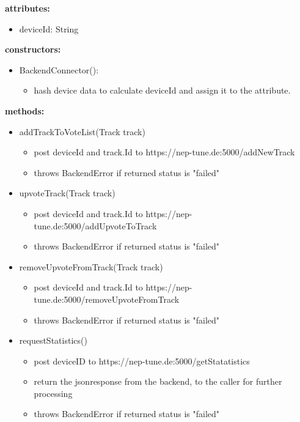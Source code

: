 \documentclass[oneside, nenglish]{sdqtechreport}
\begin{document}
 \textbf{attributes:}
 \begin{itemize}
     \item deviceId: String
 \end{itemize}
 \textbf{constructors:}
 \begin{itemize}
     \item BackendConnector():
     \begin{itemize}
         \item hash device data to calculate deviceId and assign it to the attribute.
     \end{itemize}
 \end{itemize}
 \textbf{methods:}
 \begin{itemize}
     \item addTrackToVoteList(Track track) 
     \begin{itemize}
         \item post deviceId and track.Id to https://nep-tune.de:5000/addNewTrack
         \item throws BackendError if returned status is "failed"
     \end{itemize}
     \item upvoteTrack(Track track)
     \begin{itemize}
         \item post deviceId and track.Id to https://nep-tune.de:5000/addUpvoteToTrack
         \item throws BackendError if returned status is "failed"
     \end{itemize}
     \item removeUpvoteFromTrack(Track track)
     \begin{itemize}
         \item post deviceId and track.Id to https://nep-tune.de:5000/removeUpvoteFromTrack
          \item throws BackendError if returned status is "failed"
     \end{itemize}
     \item requestStatistics()
     \begin{itemize}
         \item post deviceID to https://nep-tune.de:5000/getStatatistics
         \item return the jsonresponse from the backend, to the caller for further processing
         \item throws BackendError if returned status is "failed"
     \end{itemize}
     

\end{itemize}
\end{document}
